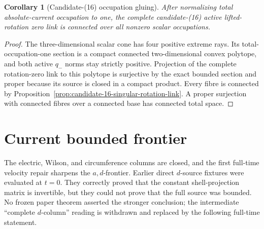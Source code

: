 \documentclass[11pt]{article}
\newtheorem{corollary}[theorem]{Corollary}
\theoremstyle{definition}
\theoremstyle{remark}
\begin{document}
\begin{corollary}[Candidate-(16) occupation gluing]
\label{cor:candidate-16-occupation-gluing}
After normalizing total absolute-current occupation to one, the complete
candidate-(16) active lifted-rotation zero link is connected over all
nonzero scalar occupations.
\end{corollary}

\begin{proof}
The three-dimensional scalar cone has four positive extreme rays.  Its
total-occupation-one section is a compact connected two-dimensional convex
polytope, and both active \(q_-\) norms stay strictly positive.  Projection
of the complete rotation-zero link to this polytope is surjective by the
exact bounded section and proper because its source is closed in a compact
product.  Every fibre is connected by
Proposition~\ref{prop:candidate-16-singular-rotation-link}.  A proper
surjection with connected fibres over a connected base has connected total
space.
\end{proof}

\section{Current bounded frontier}

The electric, Wilson, and circumference columns are closed, and the first
full-time velocity repair sharpens the \(a,d\)-frontier.  Earlier direct
\(d\)-source fixtures were evaluated at \(t=0\).  They correctly proved that
the constant shell-projection matrix is invertible, but they could not prove
that the full source was bounded.  No frozen paper theorem asserted the
stronger conclusion; the intermediate ``complete \(d\)-column'' reading is
withdrawn and replaced by the following full-time statement.
\end{document}

